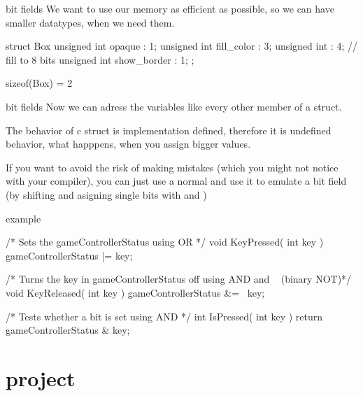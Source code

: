 \documentclass[10pt,graphics,aspectratio=169,table]{beamer}
\begin{document}
\begin{frame}[fragile]{bit fields}
We want to use our memory as efficient as possible, so we can have smaller datatypes, when we need them.

\begin{codeblock}
struct Box
{
  unsigned int  opaque       : 1;
  unsigned int  fill_color   : 3;
  unsigned int               : 4; // fill to 8 bits
  unsigned int  show_border  : 1;
};


sizeof(Box) = 2
\end{codeblock}

\end{frame}

\begin{frame}[fragile]{bit fields}
Now we can adress the variables like every other member of a struct.

The behavior of c struct is implementation defined, therefore it is undefined behavior, what happpens,
when you assign bigger values.

If you want to avoid the risk of making mistakes (which you might not notice with your compiler), 
you can just use a normal  and use it to emulate a bit field (by shifting and asigning 
single bits with \code{|=} and \code{&=})
\end{frame}

\begin{frame}[fragile]{example}
  \begin{codeblock}

/* Sets the gameControllerStatus using OR */
void KeyPressed( int key ) { gameControllerStatus |= key; }

/* Turns the key in gameControllerStatus off
using AND and ~ (binary NOT)*/
void KeyReleased( int key ) { gameControllerStatus &= ~key; }

/* Tests whether a bit is set using AND */
int IsPressed( int key ) { return gameControllerStatus & key; }

  \end{codeblock}
\end{frame}

\section{project}
\end{document}

